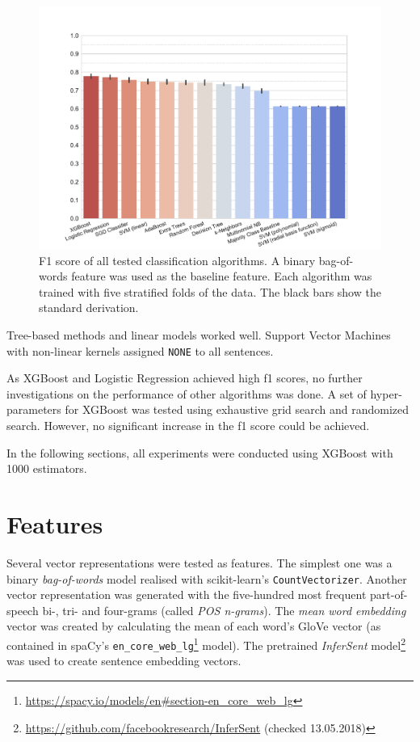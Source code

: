 \begin{figure}[tb]
\centering
\caption{F1 score of all tested classification algorithms. A binary bag-of-words feature was used as the baseline feature. Each algorithm was trained with five stratified folds of the data. The black bars show the standard derivation.}
\label{tbl:algo}
\includegraphics[width=1\linewidth]{images/classifier}
\end{figure}


Tree-based methods and linear models worked well. Support Vector Machines with non-linear kernels assigned \texttt{NONE} to all sentences.

As XGBoost and Logistic Regression achieved high f1 scores, no further investigations on the performance of other algorithms was done. A set of hyper-parameters for XGBoost was tested using exhaustive grid search and randomized search. However, no significant increase in the f1 score could be achieved.

In the following sections, all experiments were conducted using XGBoost with 1000 estimators.


\section{Features}
\label{sec:features}
Several vector representations were tested as features. The simplest one was a binary \emph{bag-of-words} model realised with scikit-learn's \texttt{CountVectorizer}. Another vector representation was generated with the five-hundred most frequent part-of-speech bi-, tri- and four-grams (called \emph{POS n-grams}). The \emph{mean word embedding} vector was created by calculating the mean of each word's GloVe vector (as contained in spaCy's \texttt{en\_core\_web\_lg}\footnote{\url{https://spacy.io/models/en\#section-en\_core\_web\_lg}} model). The pretrained \emph{InferSent} model\footnote{\url{https://github.com/facebookresearch/InferSent} (checked 13.05.2018)} was used to create sentence embedding vectors.

